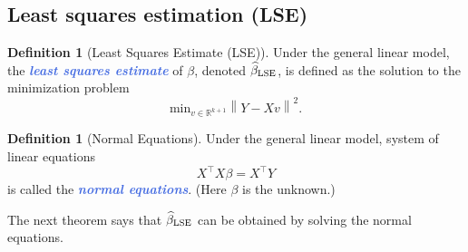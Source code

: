 \documentclass[10pt]{article}
\theoremstyle{definition}
\newtheorem{definition}[theorem]{Definition}
\newcommand{\norm}[1]{\left\lVert#1\right\rVert} %
\newcommand{\1}[1]{\textbf{1}_{\left[#1\right]}} %
\def\R{\mathbb{R}} %
\newcommand{\demph}[1]{\textcolor{RoyalBlue}{\textbf{\slshape #1}}} %
\begin{document}
\subsection{Least squares estimation (LSE)}
\begin{definition}[Least Squares Estimate (LSE)]
  \label{def:least-squares-estimate-lse}
  Under the general linear model, the \demph{least squares estimate} of
  $\beta$, denoted $\widehat{\beta}_{\rm LSE}$, is defined as the solution to
  the minimization problem
  \begin{equation*}
    \mathrm{min}_{v\in \R^{k+1}} \norm{Y-Xv}^{2}.
  \end{equation*}
\end{definition}

\begin{definition}[Normal Equations]
  Under the general linear model, system of linear equations
  \begin{equation}\label{eq:normal-equations-general}
    X^{\top} X \beta=X^{\top}Y
  \end{equation}
  is called the \demph{normal equations}. (Here $\beta$ is the unknown.)
\end{definition}

The next theorem says that $\widehat{\beta}_{\rm LSE}$ can be obtained by
solving the normal equations.
\end{document}
